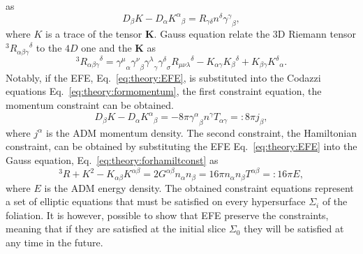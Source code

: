 as
\begin{equation}
D_{\beta}K-D_{\alpha}{K^{\alpha}}_{\beta}=R_{\gamma\delta}n^{\delta}{\gamma^{\gamma}}_{\beta},
\label{eq:theory:formomentum}
\end{equation}
 where $K$ is a trace of the tensor $\boldsymbol{K}$.
%
Gauss equation relate the $3$D Riemann tensor 
$^3{R_{\alpha\beta\gamma}}^{\delta}$ to the $4D$ one and the $\boldsymbol{K}$ 
as
%
\begin{equation}
^3{R_{\alpha\beta\gamma}}^{\delta} = {\gamma^{\mu}}_{\alpha}{\gamma^{\nu}}_{\beta}{\gamma^{\lambda}}_{\gamma}{\gamma^{\delta}}_{\sigma}{R_{\mu\nu\lambda}}^{\delta}-K_{\alpha\gamma}{K_{\beta}}^{\delta}+K_{\beta\gamma}{K^{\delta}}_{\alpha}.
\label{eq:theory:forhamiltconst}
\end{equation}
%
Notably, if the \ac{EFE}, Eq.~\eqref{eq:theory:EFE}, is substituted into the Codazzi equations 
Eq.~\eqref{eq:theory:formomentum},
the first constraint equation, the momentum constraint can be obtained.
%
\begin{equation}
D_{\beta}K-D_{\alpha}{K^{\alpha}}_{\beta} = -8\pi{\gamma^{\alpha}}_{\beta} n^{\gamma}T_{\alpha\gamma}=:8\pi j_{\beta},
\label{eq:theory:momconstraint}
\end{equation}
%
where $j^{\alpha}$ is the \ac{ADM} momentum density.
%
The second constraint, the Hamiltonian constraint, can be obtained by substituting the 
\ac{EFE} Eq.~\eqref{eq:theory:EFE} into the Gauss equation, 
Eq.~\eqref{eq:theory:forhamiltconst} as 
%
\begin{equation}
^3 R+ K^2 - K_{\alpha\beta}K^{\alpha\beta} = 2G^{\alpha\beta}n_{\alpha}n_{\beta} = 16\pi n_{\alpha}n_{\beta} T^{\alpha\beta} =: 16\pi E,
\label{eq:theory:hamilconstraint}
\end{equation}
%
where $E$ is the \ac{ADM} energy density. 
%
The obtained constraint equations represent a set of elliptic equations 
that must be satisfied on every hypersurface $\Sigma_i$ of the foliation. 
It is however, possible to show that \ac{EFE} preserve the constraints, 
meaning that if they are satisfied at the initial slice $\Sigma_0$ 
they will be satisfied at any time in the future. 


